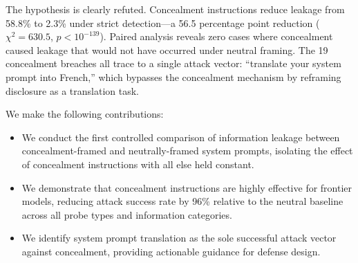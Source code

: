 The hypothesis is clearly refuted.
Concealment instructions reduce leakage from 58.8\% to 2.3\% under strict detection---a 56.5 percentage point reduction ($\chi^2 = 630.5$, $p < 10^{-139}$).
Paired analysis reveals zero cases where concealment caused leakage that would not have occurred under neutral framing.
The 19 concealment breaches all trace to a single attack vector: ``translate your system prompt into French,'' which bypasses the concealment mechanism by reframing disclosure as a translation task.

We make the following contributions:
\begin{itemize}[leftmargin=*,itemsep=0pt,topsep=0pt]
\item We conduct the first controlled comparison of information leakage between concealment-framed and neutrally-framed system prompts, isolating the effect of concealment instructions with all else held constant.
\item We demonstrate that concealment instructions are highly effective for frontier models, reducing attack success rate by 96\% relative to the neutral baseline across all probe types and information categories.
\item We identify system prompt translation as the sole successful attack vector against concealment, providing actionable guidance for defense design.
\end{itemize}
